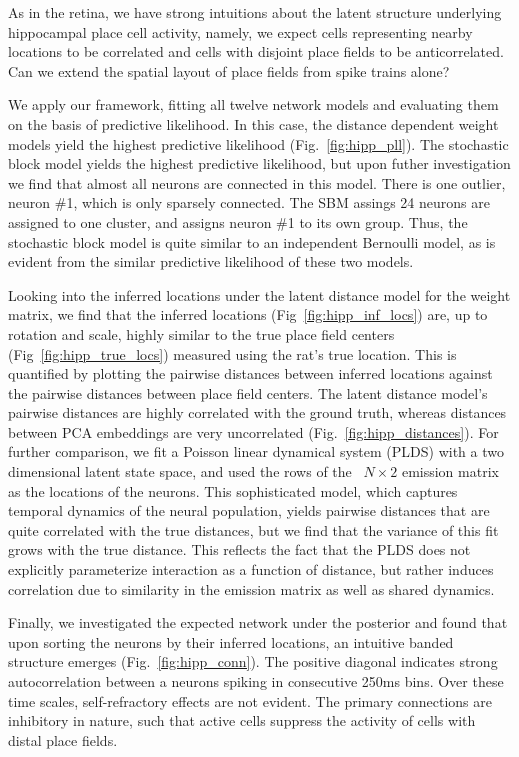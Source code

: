 As in the retina, we have strong intuitions about the latent structure underlying hippocampal place cell activity, namely, we expect cells representing nearby locations to be correlated and cells with disjoint place fields to be anticorrelated. Can we extend the spatial layout of place fields from spike trains alone?

We apply our framework, fitting all twelve network models and
evaluating them on the basis of predictive likelihood. In this case,
the distance dependent weight models yield the highest predictive
likelihood (Fig.~\ref{fig:hipp_pll}). The stochastic block model
yields the highest predictive likelihood, but upon futher
investigation we find that almost all neurons are connected in this
model. There is one outlier, neuron \#1, which is only sparsely
connected. The SBM assings 24 neurons are assigned to one cluster, and
assigns neuron \#1 to its own group. 
Thus, the stochastic block model is quite similar to an independent
Bernoulli model, as is evident from the similar predictive likelihood 
of these two models. 

Looking into the inferred locations under the latent distance model
for the weight matrix, we find that the inferred locations
(Fig~\ref{fig:hipp_inf_locs}) are, up to rotation and scale, highly
similar to the true place field centers (Fig~\ref{fig:hipp_true_locs})
measured using the rat's true location. This is quantified by 
plotting the pairwise distances between inferred locations against 
the pairwise distances between place field centers. The latent 
distance model's pairwise distances are highly correlated with the 
ground truth, whereas distances between PCA embeddings are very uncorrelated (Fig.~\ref{fig:hipp_distances}). For further comparison, we fit a Poisson linear dynamical system (PLDS) \cite{macke2011empirical} with a two dimensional latent state space, and used the rows of the 
~$N \times 2$ emission matrix as the locations of the neurons. This sophisticated 
model, which captures temporal dynamics of the neural population, yields 
pairwise distances that are quite correlated with the true distances, 
but we find that the variance of this fit grows with the true distance.
This reflects the fact that the PLDS does not explicitly parameterize
interaction as a function of distance, but rather induces correlation 
due to similarity in the emission matrix as well as shared dynamics.

Finally, we investigated the expected network under the posterior and 
found that upon sorting the neurons by their inferred locations, an
intuitive banded structure emerges (Fig.~\ref{fig:hipp_conn}). 
The positive diagonal indicates strong autocorrelation between a 
neurons spiking in consecutive 250ms bins. Over these time scales, 
self-refractory effects are not evident. The primary connections 
are inhibitory in nature, such that active cells suppress the activity 
of cells with distal place fields. 

